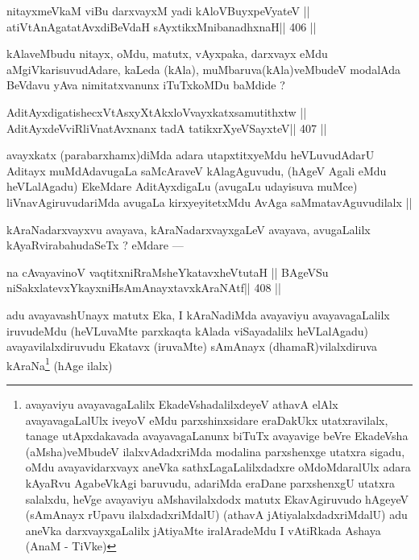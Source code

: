 \begin{shl}
nitayxmeVkaM viBu darxvayxM yadi kAloV\s BuyxpeVyateV ||
atiVtAnAgatatAvxdiBeVdaH sAyxtikxMnibanadhxnaH\hfill || 406 ||
\end{shl}

\begin{artha}
kAlaveMbudu nitayx, oMdu, matutx, vAyxpaka, darxvayx eMdu aMgiVkarisuvudAdare, kaLeda (kAla), muMbaruva(kAla)veMbudeV modalAda BeVdavu yAva nimitatxvanunx iTuTxkoMDu baMdide ?
\end{artha}

\begin{shl}
AditAyxdigatishecxVtAsxyXtAkxloV\s vayxkatxsamutithxtw ||
AditAyxdeVviRliVnatAvxnanx tadA tatikxrXyeVSayxteV\hfill || 407 ||
\end{shl}

\begin{artha}
avayxkatx (parabarxhamx)diMda adara utapxtitxyeMdu heVLuvudAdarU Aditayx muMdAdavugaLa saMcAraveV kAlagAguvudu, (hAgeV Agali eMdu heVLalAgadu) EkeMdare AditAyxdigaLu (avugaLu udayisuva muMce) liVnavAgiruvudariMda avugaLa kirxyeyitetxMdu AvAga saMmatavAguvudilalx ||
\end{artha}

\begin{artha}
kAraNadarxvayxvu avayava, kAraNadarxvayxgaLeV avayava, avugaLalilx kAyaRvirabahudaSeTx ? eMdare ---
\end{artha}

\begin{shl}
na cAvayavinoV vaqtitxniRraMsheYkatavxheVtutaH ||
BAgeVSu niSakxlatevxYkayxniHsAmAnayxtavxkAraNAtf\hfill || 408 ||
\end{shl}

\begin{artha}
adu avayavashUnayx matutx Eka, I kAraNadiMda avayaviyu avayavagaLalilx iruvudeMdu (heVLuvaMte parxkaqta kAlada viSayadalilx heVLalAgadu) avayavilalxdiruvudu Ekatavx (iruvaMte) sAmAnayx (dhamaR)vilalxdiruva kAraNa\footnote[1]{avayaviyu avayavagaLalilx EkadeVshadalilxdeyeV athavA elAlx avayavagaLalUlx iveyoV eMdu parxshinxsidare eraDakUkx utatxravilalx, tanage utApxdakavada avayavagaLanunx biTuTx avayavige beVre EkadeVsha (aMsha)veMbudeV ilalxvAdadxriMda modalina parxshenxge utatxra sigadu, oMdu avayavidarxvayx aneVka sathxLagaLalilxdadxre oMdoMdaralUlx adara kAyaRvu AgabeVkAgi baruvudu, adariMda eraDane parxshenxgU utatxra salalxdu, heVge avayaviyu aMshavilalxdodx matutx EkavAgiruvudo hAgeyeV (sAmAnayx rUpavu ilalxdadxriMdalU) (athavA jAtiyalalxdadxriMdalU) adu aneVka darxvayxgaLalilx jAtiyaMte iralAradeMdu I vAtiRkada Ashaya (AnaM - TiVke)} (hAge ilalx) 
\end{artha}

